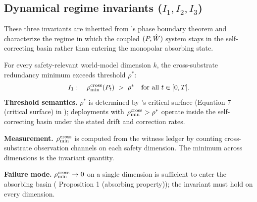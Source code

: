 \subsection{Dynamical regime invariants (\texorpdfstring{$I_1, I_2, I_3$}{I1, I2, I3})}
\label{sec:dynamical_invariants}

These three invariants are inherited from
\citep[Phase~Redundancy]{lasser2026phase}'s phase boundary theorem and
characterize the regime in which the coupled $(P, \hat{W})$ system stays in the
self-correcting basin rather than entering the monopolar absorbing state.

\begin{definition}
\label{inv:I1}
For every safety-relevant world-model dimension $k$, the
cross-substrate redundancy minimum exceeds threshold $\rho^*$:
\[
  I_1: \quad \rho_{\min}^{\mathrm{cross}}(P_t) \;>\; \rho^* \quad \text{for all } t \in [0, T].
\]
\textbf{Threshold semantics.} $\rho^*$ is determined by
    \citep[Phase~Redundancy]{lasser2026phase}'s critical surface (Equation 7
    (critical surface) in \citep{lasser2026phase}); deployments with
    $\rho_{\min}^{\mathrm{cross}} > \rho^*$ operate inside the self-correcting basin under the
    stated drift and correction rates.

\textbf{Measurement.} $\rho_{\min}^{\mathrm{cross}}$ is computed from the witness ledger by
    counting cross-substrate observation channels on each safety dimension. The
    minimum across dimensions is the invariant quantity.

\textbf{Failure mode.} $\rho_{\min}^{\mathrm{cross}} \to 0$ on a single dimension is sufficient
    to enter the absorbing basin (\citep[Phase~Redundancy]{lasser2026phase}
    Proposition 1 (absorbing property)); the invariant must hold on every
    dimension.
\end{definition}

